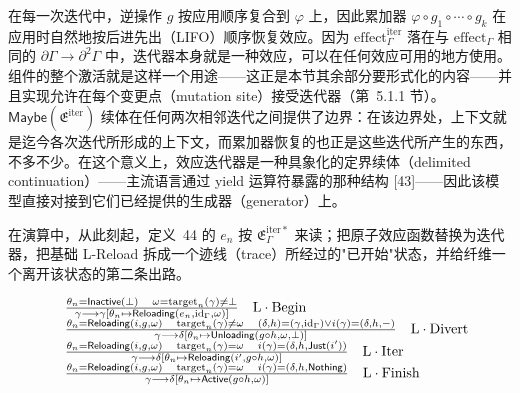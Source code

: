 \documentclass[
  10
]{article}
\begin{document}
在每一次迭代中，逆操作 \(g\) 按应用顺序复合到 \(\varphi\) 上，因此累加器 \(\varphi \circ g _ { 1 } \circ \cdots \circ g _ { k }\) 在应用时自然地按后进先出（LIFO）顺序恢复效应。因为 \(\mathrm { e f f e c t } _ { \Gamma } ^ { \mathrm { i t e r } }\) 落在与 \(\mathrm { e f f e c t } _ { \Gamma }\) 相同的 \(\partial \Gamma \to \partial ^ { 2 } \Gamma\) 中，迭代器本身就是一种效应，可以在任何效应可用的地方使用。组件的整个激活就是这样一个用途——这正是本节其余部分要形式化的内容——并且实现允许在每个变更点（mutation site）接受迭代器（第~5.1.1 节）。\(\mathsf { M a y b e } ( \mathfrak { E } ^ { \mathrm { i t e r } } )\) 续体在任何两次相邻迭代之间提供了边界：在该边界处，上下文就是迄今各次迭代所形成的上下文，而累加器恢复的也正是这些迭代所产生的东西，不多不少。在这个意义上，效应迭代器是一种具象化的定界续体（delimited continuation）——主流语言通过 yield 运算符暴露的那种结构 {[}43{]}——因此该模型直接对接到它们已经提供的生成器（generator）上。

在演算中，从此刻起，定义~44 的 \(e _ { n }\) 按 \(\mathfrak { E } _ { \Gamma } ^ { \mathrm { i t e r * } }\) 来读；把原子效应函数替换为迭代器，把基础 L-Reload 拆成一个迹线（trace）所经过的"已开始"状态，并给纤维一个离开该状态的第二条出路。

\[
\begin{array} { r l } & { \frac { \theta _ { n } = \mathsf { I n a c t i v e } ( \perp ) \quad \omega = \mathrm { t a r g e t } _ { n } ( \gamma ) \neq \perp } { \gamma \longrightarrow \gamma [ \theta _ { n } \mapsto \mathsf { R e l o a d i n g } ( e _ { n } , \mathrm { i d } _ { \Gamma } , \omega ) ] } \quad \mathrm { L \cdot B e g i n } } \\ & { \frac { \theta _ { n } = \mathsf { R e l o a d i n g } ( i , g , \omega ) \quad \mathrm { t a r g e t } _ { n } ( \gamma ) \neq \omega \quad ( \delta , h ) = ( \gamma , \mathrm { i d } _ { \Gamma } ) \vee i ( \gamma ) = ( \delta , h , - ) } { \gamma \longrightarrow \delta [ \theta _ { n } \mapsto \mathsf { U n l o a d i n g } ( g \circ h , \omega , \perp ) ] } \quad \mathrm { L \cdot D i v e r t } } \\ & { \frac { \theta _ { n } = \mathsf { R e l o a d i n g } ( i , g , \omega ) \quad \mathrm { t a r g e t } _ { n } ( \gamma ) = \omega \quad i ( \gamma ) = ( \delta , h , \mathsf { J u s t } ( i ^ { \prime } ) ) } { \gamma \longrightarrow \delta [ \theta _ { n } \mapsto \mathsf { R e l o a d i n g } ( i ^ { \prime } , g \circ h , \omega ) ] } \quad \mathrm { L \cdot I t e r } } \\ & { \frac { \theta _ { n } = \mathsf { R e l o a d i n g } ( i , g , \omega ) \quad \mathrm { t a r g e t } _ { n } ( \gamma ) = \omega \quad i ( \gamma ) = ( \delta , h , \mathsf { N o t h i n g } ) } { \gamma \longrightarrow \delta [ \theta _ { n } \mapsto \mathsf { A c t i v e } ( g \circ h , \omega ) ] } \quad \mathrm { L \cdot F i n i s h } } \end{array}
\]
\end{document}
